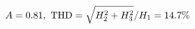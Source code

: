 \documentclass[preview]{standalone}
\begin{document}
\begin{align*}
\special{dvisvgm:raw <g id='unique000'>}A=0.81,\ \text{THD}=\sqrt{H_2^2+H_3^2}/H_1=14.7\%\special{dvisvgm:raw </g>}
\end{align*}
\end{document}

